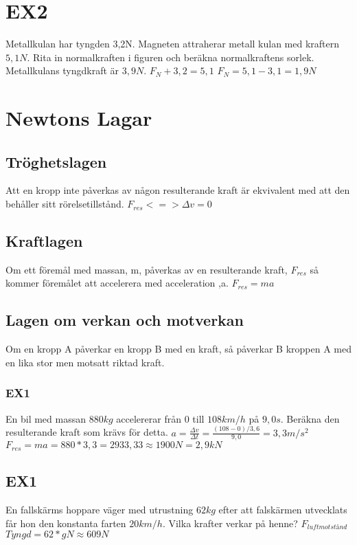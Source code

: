 \documentclass[a4paper,11pt]{article}
\begin{document}
\begin{flushleft}
\section{EX2}
Metallkulan har tyngden 3,2N. Magneten attraherar metall kulan med kraftern $ 5,1N $. Rita in normalkraften i figuren och beräkna normalkraftens sorlek. Metallkulans tyngdkraft är $ 3,9N $.\newline
$ F_N+3,2=5,1 $\newline
$ F_N=5,1-3,1=1,9N $
\section{Newtons Lagar}
\subsection{Tröghetslagen} Att en kropp inte påverkas av någon resulterande kraft är ekvivalent med att den behåller sitt rörelsetillstånd.\newline
$ F_{res}<=> \Delta v=0 $
\newline
\subsection{Kraftlagen}
Om ett föremål med massan, m, påverkas av en resulterande kraft, $ F_{res} $ så kommer föremålet att accelerera med acceleration ,a. $ F_{res}=ma $
\subsection{Lagen om verkan och motverkan}
Om en kropp A påverkar en kropp B med en kraft, så påverkar B kroppen A med en lika stor men motsatt riktad kraft.
\subsubsection{EX1}
En bil med massan $880kg$ accelererar från 0 till $108km/h$ på $9,0s$.\newline
Beräkna den resulterande kraft som krävs för detta.\newline
$ a=\frac{\Delta v}{\Delta t}=\frac{(108-0)/3,6}{9,0}=3,3m/s^2 $\newline
$ F_{res}=ma=880*3,3=2933,33\approx1900N=2,9kN $
\subsection{EX1}
En fallskärms hoppare väger med utrustning $62kg$ efter att falskärmen utvecklats får hon den konstanta farten $20km/h$.\newline
Vilka krafter verkar på henne?\newline
$F_{luftmotstånd} $
$ Tyngd=62*gN \approx 609N $
\end{flushleft}
\end{document}
